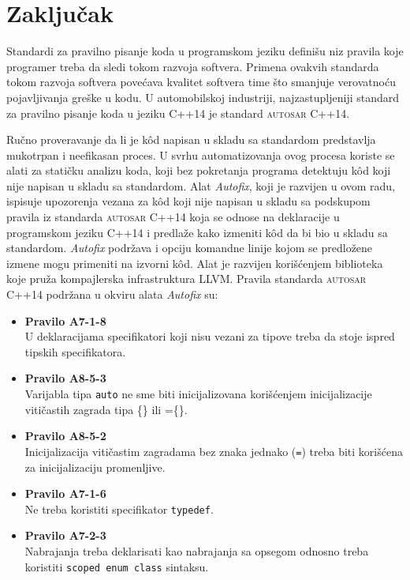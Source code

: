 \documentclass[12pt,oneside]{memoir}
\begin{document}



\chapter{Zaključak}

Standardi za pravilno pisanje koda u programskom jeziku defini\v{s}u niz pravila koje programer treba da sledi tokom razvoja softvera. Primena ovakvih standarda
tokom razvoja softvera pove\'{c}ava kvalitet softvera time \v{s}to smanjuje verovatno\'{c}u pojavljivanja gre\v{s}ke u kodu. U automobilskoj industriji,
najzastupljeniji standard za pravilno pisanje koda u jeziku C++14 je standard \textsc{autosar} C++14.
\par
Ru\v{c}no proveravanje da li je k\^{o}d napisan u skladu sa standardom predstavlja mukotrpan i neefikasan proces. U svrhu automatizovanja ovog procesa
koriste se alati za stati\v{c}ku analizu koda, koji bez pokretanja programa detektuju k\^{o}d koji nije napisan u skladu sa standardom. Alat \textit{Autofix}, koji je razvijen u ovom radu, ispisuje upozorenja vezana za k\^{o}d koji nije napisan u skladu sa podskupom pravila iz standarda \textsc{autosar} C++14 koja se odnose na deklaracije u programskom jeziku C++14 i predla\v{z}e kako izmeniti k\^{o}d da bi bio u skladu sa standardom. \textit{Autofix} podr\v{z}ava i opciju komandne linije kojom se predlo\v{z}ene izmene mogu primeniti na izvorni k\^{o}d. Alat je razvijen kori\v{s}\'{c}enjem biblioteka koje pru\v{z}a kompajlerska infrastruktura LLVM. Pravila standarda \textsc{autosar} C++14 podr\v{z}ana u okviru alata \textit{Autofix} su:

\begin{itemize}

\item{\textbf{Pravilo A7-1-8} \\
         U deklaracijama specifikatori koji nisu vezani za tipove treba da stoje
         ispred tipskih specifikatora.
}
\item{\textbf{Pravilo A8-5-3} \\
Varijabla tipa \texttt{auto} ne sme biti inicijalizovana kori\v{s}\'{c}enjem
inicijalizacije viti\v{c}astih zagrada tipa \{\} ili =\{\}.
}
\item{\textbf{Pravilo A8-5-2} \\
Inicijalizacija viti\v{c}astim zagradama bez znaka jednako (\texttt{=}) treba biti kori\v{s}\'{c}ena za inicijalizaciju promenljive.
}
\item{\textbf{Pravilo A7-1-6} \\
Ne treba koristiti specifikator \texttt{typedef}. 
}
\item{\textbf{Pravilo A7-2-3} \\
Nabrajanja treba deklarisati kao nabrajanja sa opsegom odnosno treba koristiti \texttt{scoped enum class} sintaksu.
}

\end{itemize}
\end{document}
